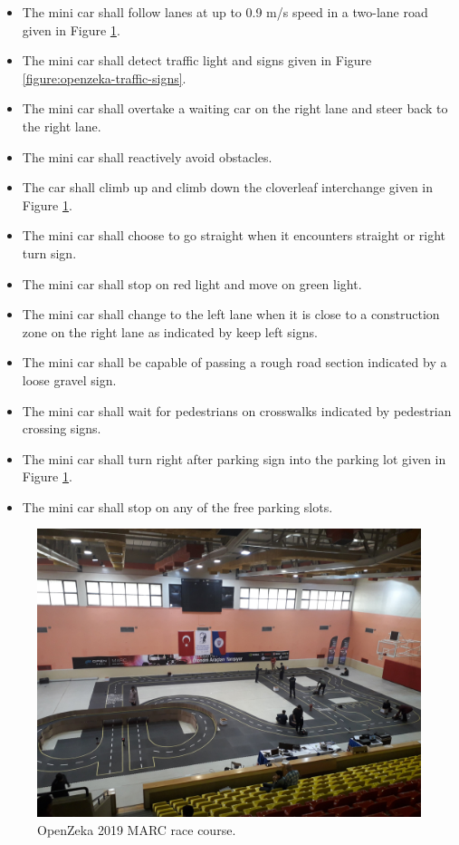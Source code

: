 \begin{itemize}
  \item The mini car shall follow lanes at up to 0.9 m/s speed in a two-lane
    road given in Figure \ref{figure:openzeka-race-course}.
  \item The mini car shall detect traffic light and signs given in Figure
    \ref{figure:openzeka-traffic-signs}.
  \item The mini car shall overtake a waiting car on the right lane and steer
    back to the right lane.
  \item The mini car shall reactively avoid obstacles.
  \item The car shall climb up and climb down the cloverleaf interchange given
    in Figure \ref{figure:openzeka-race-course}.
  \item The mini car shall choose to go straight when it encounters straight or
    right turn sign.
  \item The mini car shall stop on red light and move on green light.
  \item The mini car shall change to the left lane when it is close to a
    construction zone on the right lane as indicated by keep left signs.
  \item The mini car shall be capable of passing a rough road section indicated
    by a loose gravel sign.
  \item The mini car shall wait for pedestrians on crosswalks indicated by
    pedestrian crossing signs.
  \item The mini car shall turn right after parking sign into the parking lot
    given in Figure \ref{figure:openzeka-race-course}.
  \item The mini car shall stop on any of the free parking slots.
\end{itemize}

\begin{figure}[h]
  \centering
  \includegraphics[width=.8\textwidth]{figures/openzeka-race-course.jpeg}
  \caption[OpenZeka 2019 MARC race course]{OpenZeka 2019 MARC race course.}
  \label{figure:openzeka-race-course}
\end{figure}

